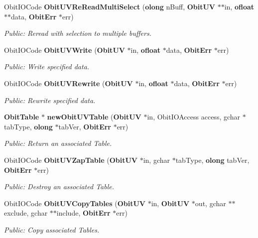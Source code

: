 \begin{CompactItemize}
Obit\-IOCode {\bf Obit\-UVRe\-Read\-Multi\-Select} ({\bf olong} n\-Buff, {\bf Obit\-UV} $\ast$$\ast$in, {\bf ofloat} $\ast$$\ast$data, {\bf Obit\-Err} $\ast$err)
\begin{CompactList}\small\item\em Public: Reread with selection to multiple buffers. \item\end{CompactList}\item 
Obit\-IOCode {\bf Obit\-UVWrite} ({\bf Obit\-UV} $\ast$in, {\bf ofloat} $\ast$data, {\bf Obit\-Err} $\ast$err)
\begin{CompactList}\small\item\em Public: Write specified data. \item\end{CompactList}\item 
Obit\-IOCode {\bf Obit\-UVRewrite} ({\bf Obit\-UV} $\ast$in, {\bf ofloat} $\ast$data, {\bf Obit\-Err} $\ast$err)
\begin{CompactList}\small\item\em Public: Rewrite specified data. \item\end{CompactList}\item 
{\bf Obit\-Table} $\ast$ {\bf new\-Obit\-UVTable} ({\bf Obit\-UV} $\ast$in, Obit\-IOAccess access, gchar $\ast$tab\-Type, {\bf olong} $\ast$tab\-Ver, {\bf Obit\-Err} $\ast$err)
\begin{CompactList}\small\item\em Public: Return an associated Table. \item\end{CompactList}\item 
Obit\-IOCode {\bf Obit\-UVZap\-Table} ({\bf Obit\-UV} $\ast$in, gchar $\ast$tab\-Type, {\bf olong} tab\-Ver, {\bf Obit\-Err} $\ast$err)
\begin{CompactList}\small\item\em Public: Destroy an associated Table. \item\end{CompactList}\item 
Obit\-IOCode {\bf Obit\-UVCopy\-Tables} ({\bf Obit\-UV} $\ast$in, {\bf Obit\-UV} $\ast$out, gchar $\ast$$\ast$exclude, gchar $\ast$$\ast$include, {\bf Obit\-Err} $\ast$err)
\begin{CompactList}\small\item\em Public: Copy associated Tables. \item\end{CompactList}\item 

\end{CompactItemize}
